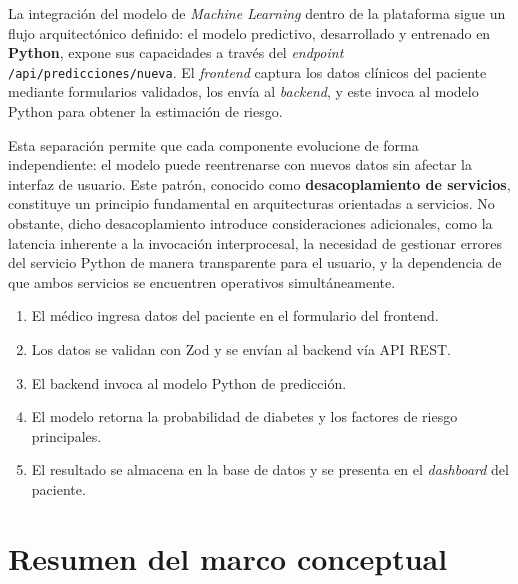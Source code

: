 \documentclass[12pt, letterpaper, twoside]{report}
\begin{document}
La integración del modelo de \textit{Machine Learning} dentro de la plataforma sigue un flujo arquitectónico definido: el modelo predictivo, desarrollado y entrenado en \textbf{Python}, expone sus capacidades a través del \textit{endpoint} \texttt{/api/predicciones/nueva}. El \textit{frontend} captura los datos clínicos del paciente mediante formularios validados, los envía al \textit{backend}, y este invoca al modelo Python para obtener la estimación de riesgo.

Esta separación permite que cada componente evolucione de forma independiente: el modelo puede reentrenarse con nuevos datos sin afectar la interfaz de usuario. Este patrón, conocido como \textbf{desacoplamiento de servicios}, constituye un principio fundamental en arquitecturas orientadas a servicios. No obstante, dicho desacoplamiento introduce consideraciones adicionales, como la latencia inherente a la invocación interprocesal, la necesidad de gestionar errores del servicio Python de manera transparente para el usuario, y la dependencia de que ambos servicios se encuentren operativos simultáneamente.

\begin{flowbox}
  \begin{enumerate}[leftmargin=1.2cm, topsep=2pt]
    \item El médico ingresa datos del paciente en el formulario del frontend.
    \item Los datos se validan con Zod y se envían al backend vía API REST.
    \item El backend invoca al modelo Python de predicción.
    \item El modelo retorna la probabilidad de diabetes y los factores de riesgo principales.
    \item El resultado se almacena en la base de datos y se presenta en el \textit{dashboard} del paciente.
  \end{enumerate}
\end{flowbox}

\section{Resumen del marco conceptual}
\end{document}
